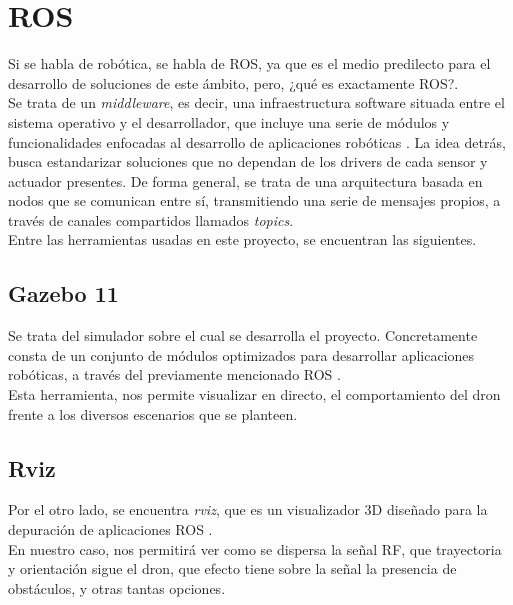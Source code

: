 \section{\ac{ROS}}
\label{sec:ros}

Si se habla de robótica, se habla de \ac{ROS}, ya que es el medio predilecto para el desarrollo de soluciones de este ámbito, pero, ¿qué es exactamente \ac{ROS}?.\\

Se trata de un \emph{middleware}, es decir, una infraestructura software situada entre el sistema operativo y el desarrollador, que incluye una serie de módulos y funcionalidades enfocadas al desarrollo de aplicaciones robóticas \cite{middleware-def} \cite{ros-def}. La idea detrás, busca estandarizar soluciones que no dependan de los drivers de cada sensor y actuador presentes. De forma general, se trata de una arquitectura basada en nodos que se comunican entre sí, transmitiendo una serie de mensajes propios, a través de canales compartidos llamados \emph{topics}.\\

Entre las herramientas usadas en este proyecto, se encuentran las siguientes.

\subsection{Gazebo 11}
\label{subsec:gazebo}

Se trata del simulador sobre el cual se desarrolla el proyecto. Concretamente consta de un conjunto de módulos optimizados para desarrollar aplicaciones robóticas, a través del previamente mencionado \ac{ROS} \cite{gazebo-def}.\\

Esta herramienta, nos permite visualizar en directo, el comportamiento del dron frente a los diversos escenarios que se planteen.

\subsection{Rviz}
\label{subsec:rviz}

Por el otro lado, se encuentra \emph{rviz}, que es un visualizador 3D diseñado para la depuración de aplicaciones \ac{ROS} \cite{rviz-def}.\\

En nuestro caso, nos permitirá ver como se dispersa la señal \ac{RF}, que trayectoria y orientación sigue el dron, que efecto tiene sobre la señal la presencia de obstáculos, y otras tantas opciones.\\

